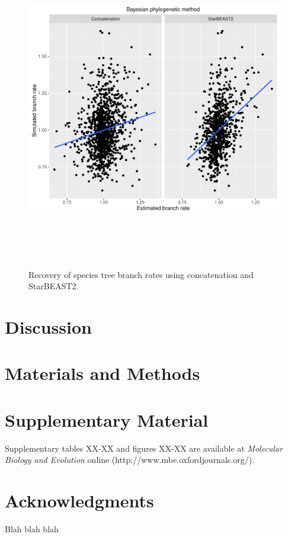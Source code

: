 \documentclass[12pt]{article}
\begin{document}
\begin{figure}[htb!]
\centering
\includegraphics[height=14cm]{branch_rates_lm.pdf}
\caption
{Recovery of species tree branch rates using concatenation and StarBEAST2.}
\label{fig:branchRatesLM}
\end{figure}

\clearpage

\section{Discussion}


\section{Materials and Methods}


\section{Supplementary Material}
Supplementary tables XX-XX and figures XX-XX are available at \textit{Molecular Biology and Evolution} online (http://www.mbe.oxfordjournals.org/).


\section{Acknowledgments}
Blah blah blah




\end{document}
